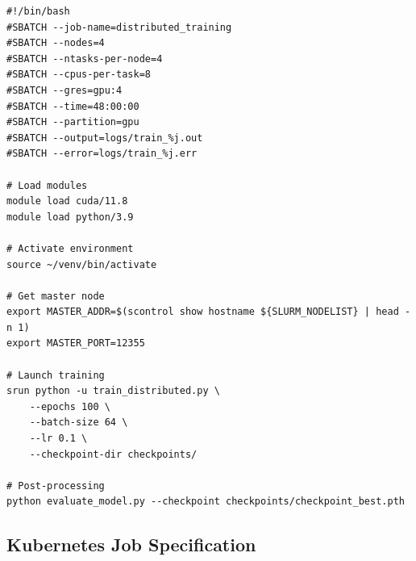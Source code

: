 \begin{lstlisting}[style=shell, caption=SLURM batch script for distributed training]
#!/bin/bash
#SBATCH --job-name=distributed_training
#SBATCH --nodes=4
#SBATCH --ntasks-per-node=4
#SBATCH --cpus-per-task=8
#SBATCH --gres=gpu:4
#SBATCH --time=48:00:00
#SBATCH --partition=gpu
#SBATCH --output=logs/train_%j.out
#SBATCH --error=logs/train_%j.err

# Load modules
module load cuda/11.8
module load python/3.9

# Activate environment
source ~/venv/bin/activate

# Get master node
export MASTER_ADDR=$(scontrol show hostname ${SLURM_NODELIST} | head -n 1)
export MASTER_PORT=12355

# Launch training
srun python -u train_distributed.py \
    --epochs 100 \
    --batch-size 64 \
    --lr 0.1 \
    --checkpoint-dir checkpoints/

# Post-processing
python evaluate_model.py --checkpoint checkpoints/checkpoint_best.pth
\end{lstlisting}

\subsection{Kubernetes Job Specification}

